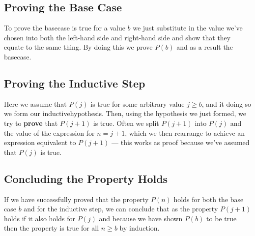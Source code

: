 \subsection{Proving the Base Case}

To prove the \gls{basecase} is true for a value $b$ we just substitute in the value we've chosen into both the left-hand side and right-hand side and show that they equate to the same thing. By doing this we prove $P(b)$ and as a result the \gls{basecase}.

\subsection{Proving the Inductive Step}

Here we assume that $P(j)$ is true for some arbitrary value $j\ge b$, and it doing so we form our \gls{inductivehypothesis}. Then, using the hypothesis we just formed, we try to {\bf prove} that $P(j+1)$ is true. Often we split $P(j+1)$ into $P(j)$ and the value of the expression for $n=j+1$, which we then rearrange to achieve an expression equivalent to $P(j+1)$ --- this works as proof because we've assumed that $P(j)$ is true.

\subsection{Concluding the Property Holds}

If we have successfully proved that the property $P(n)$ holds for both the base case $b$ and for the inductive step, we can conclude that as the property $P(j+1)$ holds if it also holds for $P(j)$ and because we have shown $P(b)$ to be true then the property is true for all $n\ge b$ by induction.
